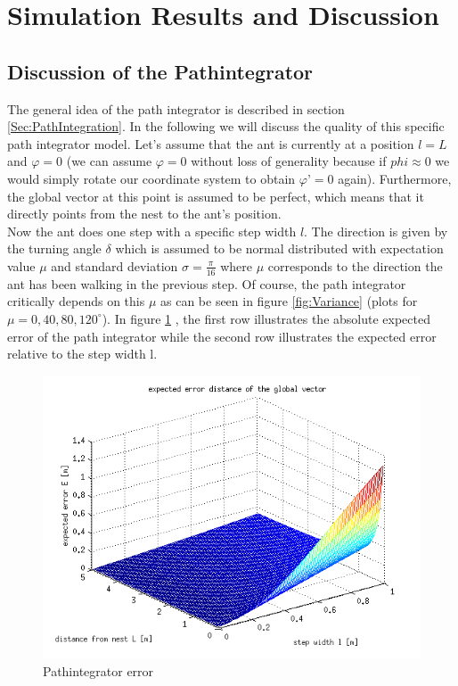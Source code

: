 \documentclass[11pt]{article}
\begin{document}



%

\section{Simulation Results and Discussion}
\subsection{Discussion of the Pathintegrator}
The general idea of the path integrator is described in section \ref{Sec:PathIntegration}. In the following we will discuss the quality of this specific path integrator model.
Let’s assume that the ant is currently at a position $l = L$ and $\varphi = 0$ (we can assume $\varphi = 0$ without loss of generality because if $phi \approx 0$ we would simply rotate our coordinate system to obtain $\varphi’ = 0$ again). Furthermore, the global vector at this point is assumed to be perfect, which means that it directly points from the nest to the ant’s position. \\
Now the ant does one step with a specific step width $l$. The direction is given by the turning angle $\delta$ which is assumed to be normal distributed with expectation value $\mu$ and standard deviation $\sigma = \frac{\pi}{16}$ where $\mu$ corresponds to the direction the ant has been walking in the previous step. Of course, the path integrator critically depends on this $\mu$ as can be seen in figure \ref{fig:Variance} (plots for $\mu=0,40,80,120^{\circ}$). In figure \ref{fig:PathintegratorError} , the first row illustrates the absolute expected error of the path integrator while the second row illustrates the expected error relative to the step width l.
\begin{figure}[H]
\centering
\includegraphics[scale=0.31]{./Pics/Pathintegrator_error_plot.png} 
\caption{Pathintegrator error \label{fig:PathintegratorError} }
\end{figure} 
\end{document}
